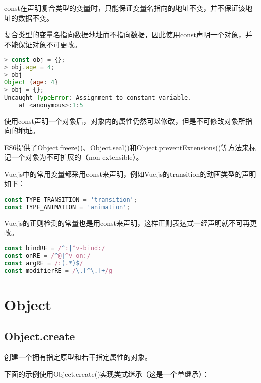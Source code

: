 const在声明复合类型的变量时，只能保证变量名指向的地址不变，并不保证该地址的数据不变。

复合类型的变量名指向数据地址而不指向数据，因此使用const声明一个对象，并不能保证对象不可更改。






\begin{lstlisting}[language=JavaScript]
> const obj = {};
> obj.age = 4;
> obj
Object {age: 4}
> obj = {};
Uncaught TypeError: Assignment to constant variable.
    at <anonymous>:1:5
\end{lstlisting}

使用const声明一个对象后，对象内的属性仍然可以修改，但是不可修改对象所指向的地址。

ES6提供了Object.freeze()、Object.seal()和Object.preventExtensions()等方法来标记一个对象为不可扩展的（non-extensible）。

Vue.js中的常用变量都采用const来声明，例如Vue.js的transition的动画类型的声明如下：


\begin{lstlisting}[language=JavaScript]
const TYPE_TRANSITION = 'transition';
const TYPE_ANIMATION = 'animation';
\end{lstlisting}

Vue.js的正则检测的常量也是用const来声明，这样正则表达式一经声明就不可再更改。







\begin{lstlisting}[language=JavaScript]
const bindRE = /^:|^v-bind:/
const onRE = /^@|^v-on:/
const argRE = /:(.*)$/
const modifierRE = /\.[^\.]+/g
\end{lstlisting}



\chapter{Object}


\section{Object.create}

创建一个拥有指定原型和若干指定属性的对象。

下面的示例使用Object.create()实现类式继承（这是一个单继承）：

